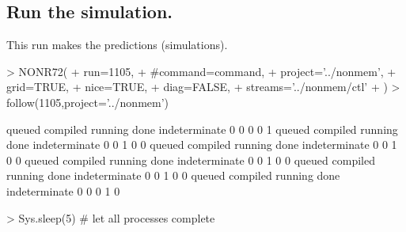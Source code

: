 \subsection{Run the simulation.}
This run makes the predictions (simulations).
\begin{Schunk}
\begin{Sinput}
> NONR72(
+      run=1105,
+      #command=command,
+      project='../nonmem',
+      grid=TRUE,
+      nice=TRUE,
+      diag=FALSE,
+      streams='../nonmem/ctl'
+ )
> follow(1105,project='../nonmem')
\end{Sinput}
\begin{Soutput}
       queued      compiled       running          done indeterminate 
            0             0             0             0             1 
       queued      compiled       running          done indeterminate 
            0             0             1             0             0 
       queued      compiled       running          done indeterminate 
            0             0             1             0             0 
       queued      compiled       running          done indeterminate 
            0             0             1             0             0 
       queued      compiled       running          done indeterminate 
            0             0             1             0             0 
       queued      compiled       running          done indeterminate 
            0             0             0             1             0 
\end{Soutput}
\begin{Sinput}
> Sys.sleep(5) # let all processes complete
\end{Sinput}
\end{Schunk}
